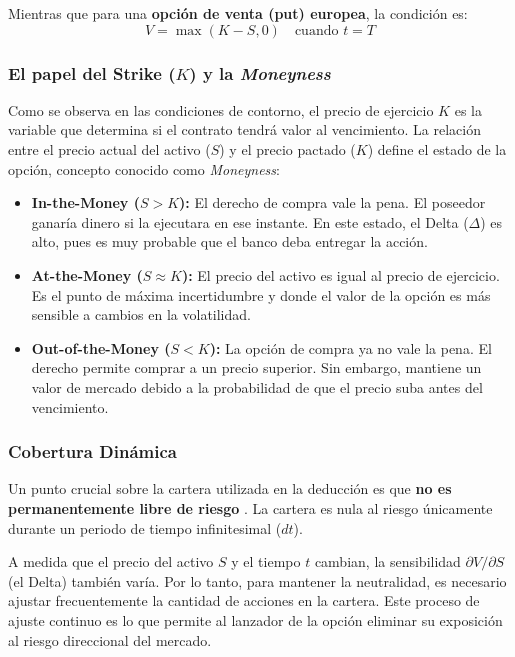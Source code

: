 \documentclass[11pt]{article}
\begin{document}
			Mientras que para una \textbf{opción de venta (put) europea}, la condición es:
			\begin{equation}
				V = \max(K - S, 0) \quad \text{cuando } t = T
			\end{equation}
			
			\subsubsection{El papel del Strike ($K$) y la \textit{Moneyness}}
			Como se observa en las condiciones de contorno, el precio de ejercicio $K$ es la variable que determina si el contrato tendrá valor al vencimiento. La relación entre el precio actual del activo ($S$) y el precio pactado ($K$) define el estado de la opción, concepto conocido como \textit{Moneyness}:
			
			\begin{itemize}
				\item \textbf{In-the-Money ($S > K$):} El derecho de compra vale la pena. El poseedor ganaría dinero si la ejecutara en ese instante. En este estado, el Delta ($\Delta$) es alto, pues es muy probable que el banco deba entregar la acción.
				\item \textbf{At-the-Money ($S \approx K$):} El precio del activo es igual al precio de ejercicio. Es el punto de máxima incertidumbre y donde el valor de la opción es más sensible a cambios en la volatilidad.
				\item \textbf{Out-of-the-Money ($S < K$):} La opción de compra ya no vale la pena. El derecho permite comprar a un precio superior. Sin embargo, mantiene un valor de mercado debido a la probabilidad de que el precio suba antes del vencimiento.
			\end{itemize}
			
			\subsubsection{Cobertura Dinámica}
				Un punto crucial sobre la cartera utilizada en la deducción es que \textbf{no es permanentemente libre de riesgo} \cite{hull2016options}. La cartera es nula al riesgo únicamente durante un periodo de tiempo infinitesimal ($dt$).
				
				A medida que el precio del activo $S$ y el tiempo $t$ cambian, la sensibilidad $\partial V / \partial S$ (el Delta) también varía. Por lo tanto, para mantener la neutralidad, es necesario ajustar frecuentemente la cantidad de acciones en la cartera. Este proceso de ajuste continuo es lo que permite al lanzador de la opción eliminar su exposición al riesgo direccional del mercado.
				
\end{document}
